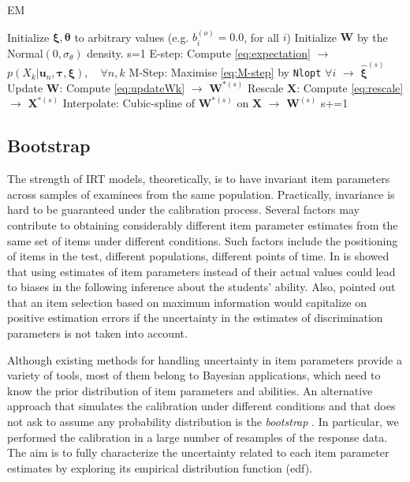 \begin{algorithm}[ht]
	\caption{EM}\label{alg:EMalg}
	\begin{algorithmic}
		\State Initialize $\boldsymbol{\xi},\boldsymbol\theta$ to arbitrary values (e.g. $b^{(o)}_i=0.0$, for all $i$)
		\State Initialize $\boldsymbol{W}$ by the Normal$(0,\sigma_\theta)$ density.
		\State s=1
		\State E-step: Compute \eqref{eq:expectation} $\rightarrow$ $p(X_k|\boldsymbol{u}_n,\boldsymbol{\tau},\boldsymbol{\xi}), \quad \forall n,k$
		\State M-Step: Maximise \eqref{eq:M-step} by \texttt{Nlopt} $\forall i$ $\rightarrow$ $ \hat{\boldsymbol{\xi}}^{(s)}$
		\State Update $\boldsymbol{W}$: Compute \eqref{eq:updateWk} $\rightarrow$ $\boldsymbol{W}^{*(s)}$
		\State Rescale $\boldsymbol{X}$: Compute \eqref{eq:rescale} $\rightarrow$ $\boldsymbol{X}^{*(s)}$
		\EndIf
		\State Interpolate: Cubic-spline of $\boldsymbol{W}^{*(s)}$ on  $\boldsymbol{X}$ $\rightarrow$ $\boldsymbol{W}^{(s)}$
		\State s+=1 
		\EndWhile
	\end{algorithmic}
\end{algorithm}

\subsection{Bootstrap}\label{sec:juliaBS}

The strength of IRT models, theoretically, is to have invariant item parameters across samples of examinees from the same population. Practically, invariance is hard to be guaranteed under the calibration process. 
Several factors may contribute to obtaining considerably different item parameter estimates from the same set of items under different conditions. Such factors include the positioning of items in the test, different populations, different points of time. In \textcite{tsutakawa1990effect} is showed that using estimates of item parameters instead of their actual values could lead to biases in the following inference about the students' ability. Also, \textcite{veldkamp2013application} pointed out that an item selection based on maximum information would capitalize on positive estimation errors if the uncertainty in the estimates of discrimination parameters is not taken into account. 

Although existing methods for handling uncertainty in item parameters provide a variety of tools, most of them belong to Bayesian applications, which need to know the prior distribution of item parameters and abilities. An alternative approach that simulates the calibration under different conditions and that does not ask to assume any probability distribution is the \emph{bootstrap} \parencite[see]{efron1993}. In particular, we performed the calibration in a large number of resamples of the response data. The aim is to fully characterize the uncertainty related to each item parameter estimates by exploring its empirical distribution function (edf). 

